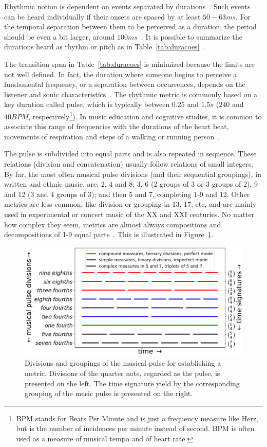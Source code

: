 \documentclass[format=acmsmall, review=false, screen=true]{acmart}
\begin{document}
Rhythmic notion is dependent on events separated by durations~\cite{Lacerda}.
Such events can be heard individually if their onsets are spaced by at least $50-63ms$.
For the temporal separation between them to be perceived as a duration,
the period should be even a bit larger, around $100ms$~\cite{microsound}.
It is possible to summarize the durations heard as rhythm or pitch
as in Table~\ref{tab:duracoes}~\cite{Alfaix, microsound}.

The transition span in Table~\ref{tab:duracoes} is minimized because the limits
are not well defined. In fact, the duration where someone begins to perceive a
fundamental frequency, or a separation between occurrences, depends on the
listener and sonic characteristics~\cite{microsound,Roederer}.
The rhythmic metric is commonly based on a key duration called pulse, which is typically between $0.25$ and $1.5s$ ($240$
and $40 BPM$, respectively\footnote{BPM stands for Beats Per Minute and is just a frequency measure like Herz, but is the number of incidences per minute instead of second. BPM is often used as a measure of musical tempo and of heart rate.}). In music education and cognitive studies, it is common to associate this range of frequencies with the durations of the heart beat, movements of respiration and steps of a walking or running person~\cite{Lacerda,Roederer}.

The pulse is subdivided into equal parts and is also repeated in sequence. These relations (division and concatenation) usually follow relations of small
integers. By far, the most often musical pulse divisions (and their sequential groupings), in written and ethnic
music, are: 2, 4 and 8; 3, 6 (2 groups of 3 or 3 groups of 2), 9 and 12 (3 and 4 groups of 3); and then 5 and 7, completing
1-9 and 12. Other metrics are less common, like division or grouping in 13, 17, etc, and are mainly used in experimental or concert music of the XX and XXI centuries. No matter how complex they seem, metrics are almost always compositions and decompositions of 1-9 equal parts~\cite{Gramani,Roederer}.
This is illustrated in Figure~\ref{fig:pulsoSubAgl}.

\begin{figure}
    \centering
        \includegraphics[width=.9\textwidth]{figures/metricaMusical__}
    \caption{Divisions and groupings of the musical pulse for establishing a metric. Divisions of the quarter note, regarded as the
        pulse, is presented on the left. The time signature yield by the corresponding grouping of the music pulse is presented on the right.}
        \label{fig:pulsoSubAgl}
\end{figure}
\end{document}
